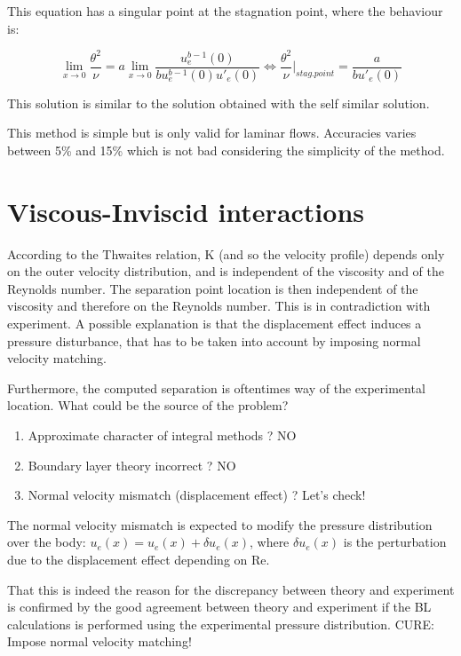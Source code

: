 This equation has a singular point at the stagnation point, where the behaviour is:

\begin{equation}
\lim_{x \rightarrow 0} \frac{\theta^2}{\nu}=a \lim_{x \rightarrow 0} \frac{u_e^{b-1}(0)}{bu_e^{b-1}(0) u'_e(0)} \Leftrightarrow  \frac{\theta^2}{\nu}|_{stag.point}=\frac{a}{bu'_e(0)}
\end{equation}

This solution is similar to the solution obtained with the self similar solution.

This method is simple but is only valid for laminar flows. Accuracies varies between  5\%  and 15\% which is not bad considering the simplicity of the method.

\section{Viscous-Inviscid interactions}

According to the Thwaites relation, K (and so the velocity profile) depends only on the outer velocity distribution, and is independent of the viscosity and of the Reynolds number.
The separation point location is then independent of the viscosity and therefore on the Reynolds number. This is in contradiction with experiment.
A possible explanation is that the displacement effect induces a pressure disturbance, that has to be taken into account by imposing normal velocity matching.

Furthermore, the computed separation is oftentimes way of the experimental location. What could be the source of the problem?
\begin{enumerate}
\item Approximate character of integral methods ? NO
\item Boundary layer theory incorrect ? NO
\item Normal velocity mismatch (displacement effect) ? Let's check!
\end{enumerate}

The normal velocity mismatch is expected to modify the pressure distribution over the body: $ u_e(x)=u_e(x)+\delta u_e(x)$, where $\delta u_e(x)$ is the perturbation due to the displacement effect depending on Re.

That this is indeed the reason for the discrepancy between theory and experiment is confirmed by the good agreement between theory and experiment if the BL calculations is performed using the experimental pressure distribution. CURE: Impose normal velocity matching!
\\

